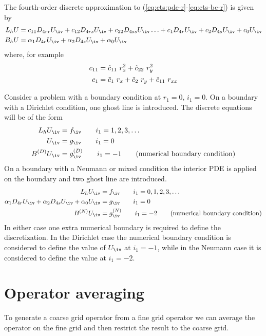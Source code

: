 \documentclass{article}
\begin{document}
The fourth-order discrete approximation to (\ref{eq:cts:pde-r}-\ref{eq:cts-bc-r})
is given by
\begin{align*}
   L_h U &= c_{11} D_{4rr} U_\iv + c_{12} D_{4rs} U_\iv + c_{22} D_{4ss} U_\iv \ldots
          + c_{1} D_{4r} U_\iv + c_{2} D_{4s} U_\iv + c_{0} U_\iv         \\        
   B_h U &= \alpha_1 D_{4r} U_\iv + \alpha_2 D_{4s} U_\iv + \alpha_0 U_\iv   
\end{align*}
where, for example
\begin{align*}
  c_{11} &=  \tilde{c}_{11}~r_x^2 + \tilde{c}_{22}~ r_y^2  \\
  c_1    &=   \tilde{c}_1~r_x + \tilde{c}_2~r_y + \tilde{c}_{11}~r_{xx} 
\end{align*}

Consider a problem with a boundary condition at $r_1=0$, $i_1=0$. 
On a boundary with a Dirichlet condition, one ghost line is introduced. 
The discrete equations will be of the form
\begin{align*}
   L_h U_\iv &= f_\iv \qquad i_1=1,2,3,\ldots \\
      U_\iv & = g_\iv   \qquad i_1=0 \\
      B^{(D)} U_\iv & = g_\iv^{(D)}  \qquad i_1=-1 \qquad\mbox{(numerical boundary condition)}
\end{align*}
On a boundary with a Neumann or mixed condition the interior PDE is applied on the boundary
and two ghost line are introduced.
\begin{align*}
   L_h U_\iv &= f_\iv \qquad i_1=0,1,2,3,\ldots \\
      \alpha_1 D_{4r} U_\iv + \alpha_2 D_{4s} U_\iv + \alpha_0 U_\iv &= g_\iv   \qquad i_1=0 \\
      B^{(N)} U_\iv & = g_\iv^{(N)}  \qquad i_1=-2 \qquad\mbox{(numerical boundary condition)}
\end{align*}
In either case one extra numerical boundary is required to define the discretization.
In the Dirichlet case the numerical boundary condition is considered to define the value of $U_\iv$
at $i_1=-1$, while in the Neumann case it is considered to define the value at $i_1=-2$.

\clearpage
\section{Operator averaging}

To generate a coarse grid operator from a fine grid operator we can
average the operator on the fine grid and then restrict the result
to the coarse grid.
\end{document}
